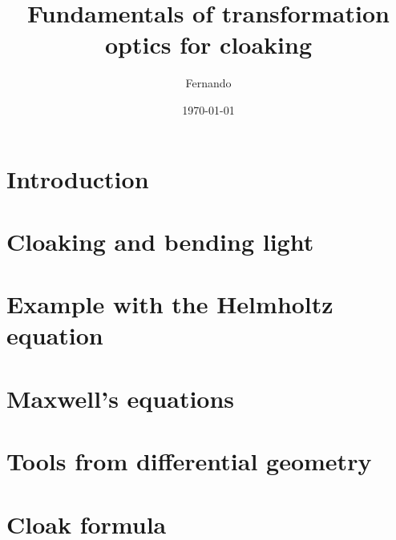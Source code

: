 \documentclass{article}
\begin{document}
\title{Fundamentals of transformation optics for cloaking}
\author{Fernando}
\date{\today}
\maketitle

\section{Introduction}

\section{Cloaking and bending light}\label{cloaking}

\section{Example with the Helmholtz equation}\label{helmholtzexample}

\section{Maxwell's equations}\label{maxwell}

\section{Tools from differential geometry}\label{diffgeo}

\section{Cloak formula}\label{cloakformula}


\printbibliography
\end{document}
